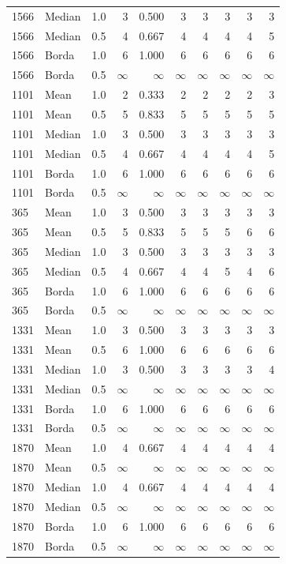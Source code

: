 \documentclass{article}
\begin{document}
\begin{longtable}{llrrr rr r rr}
1566 & Median & 1.0 & 3 & 0.500 & 3 & 3 & 3 & 3 & 3 \\
1566 & Median & 0.5 & 4 & 0.667 & 4 & 4 & 4 & 4 & 5 \\
1566 & Borda & 1.0 & 6 & 1.000 & 6 & 6 & 6 & 6 & 6 \\
1566 & Borda & 0.5 & $\infty$ & $\infty$ & $\infty$ & $\infty$ & $\infty$ & $\infty$ & $\infty$ \\
1101 & Mean & 1.0 & 2 & 0.333 & 2 & 2 & 2 & 2 & 3 \\
1101 & Mean & 0.5 & 5 & 0.833 & 5 & 5 & 5 & 5 & 5 \\
1101 & Median & 1.0 & 3 & 0.500 & 3 & 3 & 3 & 3 & 3 \\
1101 & Median & 0.5 & 4 & 0.667 & 4 & 4 & 4 & 4 & 5 \\
1101 & Borda & 1.0 & 6 & 1.000 & 6 & 6 & 6 & 6 & 6 \\
1101 & Borda & 0.5 & $\infty$ & $\infty$ & $\infty$ & $\infty$ & $\infty$ & $\infty$ & $\infty$ \\
365 & Mean & 1.0 & 3 & 0.500 & 3 & 3 & 3 & 3 & 3 \\
365 & Mean & 0.5 & 5 & 0.833 & 5 & 5 & 5 & 6 & 6 \\
365 & Median & 1.0 & 3 & 0.500 & 3 & 3 & 3 & 3 & 3 \\
365 & Median & 0.5 & 4 & 0.667 & 4 & 4 & 5 & 4 & 6 \\
365 & Borda & 1.0 & 6 & 1.000 & 6 & 6 & 6 & 6 & 6 \\
365 & Borda & 0.5 & $\infty$ & $\infty$ & $\infty$ & $\infty$ & $\infty$ & $\infty$ & $\infty$ \\
1331 & Mean & 1.0 & 3 & 0.500 & 3 & 3 & 3 & 3 & 3 \\
1331 & Mean & 0.5 & 6 & 1.000 & 6 & 6 & 6 & 6 & 6 \\
1331 & Median & 1.0 & 3 & 0.500 & 3 & 3 & 3 & 3 & 4 \\
1331 & Median & 0.5 & $\infty$ & $\infty$ & $\infty$ & $\infty$ & $\infty$ & $\infty$ & $\infty$ \\
1331 & Borda & 1.0 & 6 & 1.000 & 6 & 6 & 6 & 6 & 6 \\
1331 & Borda & 0.5 & $\infty$ & $\infty$ & $\infty$ & $\infty$ & $\infty$ & $\infty$ & $\infty$ \\
1870 & Mean & 1.0 & 4 & 0.667 & 4 & 4 & 4 & 4 & 4 \\
1870 & Mean & 0.5 & $\infty$ & $\infty$ & $\infty$ & $\infty$ & $\infty$ & $\infty$ & $\infty$ \\
1870 & Median & 1.0 & 4 & 0.667 & 4 & 4 & 4 & 4 & 4 \\
1870 & Median & 0.5 & $\infty$ & $\infty$ & $\infty$ & $\infty$ & $\infty$ & $\infty$ & $\infty$ \\
1870 & Borda & 1.0 & 6 & 1.000 & 6 & 6 & 6 & 6 & 6 \\
1870 & Borda & 0.5 & $\infty$ & $\infty$ & $\infty$ & $\infty$ & $\infty$ & $\infty$ & $\infty$ \\
\bottomrule\end{longtable}
\endgroup
\end{document}
